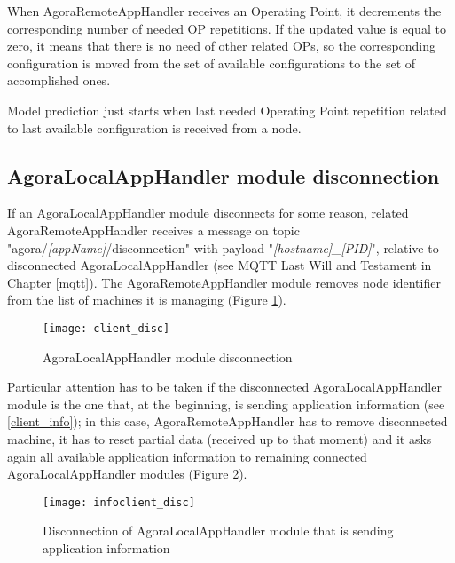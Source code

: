 When AgoraRemoteAppHandler receives an Operating Point, it decrements the corresponding number of needed OP repetitions. If the updated value is equal to zero, it means that there is no need of other related OPs, so the corresponding configuration is moved from the set of available configurations to the set of accomplished ones.

Model prediction just starts when last needed Operating Point repetition related to last available configuration is received from a node.





\subsection{AgoraLocalAppHandler module disconnection}\label{client_disc}

If an AgoraLocalAppHandler module disconnects for some reason, related Agora\-Remote\-App\-Handler receives a message on topic "agora\slash{}\textit{[appName]}\slash{}dis\-con\-nec\-tion" with payload "\textit{[hostname]\_[PID]}", relative to disconnected AgoraLocalAppHandler (see MQTT Last Will and Testament in Chapter \ref{mqtt}). The AgoraRemote\-App\-Handler module removes node identifier from the list of machines it is managing (Figure \ref{fig::locDisc}).

\begin{figure}[ht]

    \centering
    \texttt{[image: client\_disc]}
    \caption{AgoraLocalAppHandler module disconnection}

    \label{fig::locDisc}
    
\end{figure}

Particular attention has to be taken if the disconnected AgoraLocalAppHandler module is the one that, at the beginning, is sending application information (see \ref{client_info}); in this case, AgoraRemoteAppHandler has to remove disconnected machine, it has to reset partial data (received up to that moment) and it asks again all available application information to remaining connected Agora\-Local\-App\-Handler modules (Figure \ref{fig::locInfoDisc}).

\begin{figure}[t]

    \centering
    \texttt{[image: infoclient\_disc]}
    \caption{Disconnection of AgoraLocalAppHandler module that is sending application information}

    \label{fig::locInfoDisc}
    
\end{figure}





